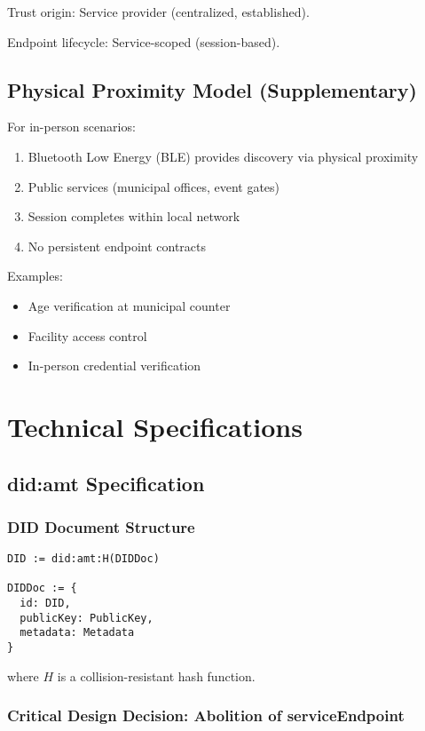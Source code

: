 Trust origin: Service provider (centralized, established).

Endpoint lifecycle: Service-scoped (session-based).

\section{Physical Proximity Model (Supplementary)}

For in-person scenarios:
\begin{enumerate}
  \item Bluetooth Low Energy (BLE) provides discovery via physical proximity
  \item Public services (municipal offices, event gates)
  \item Session completes within local network
  \item No persistent endpoint contracts
\end{enumerate}

Examples:
\begin{itemize}
  \item Age verification at municipal counter
  \item Facility access control
  \item In-person credential verification
\end{itemize}

\chapter{Technical Specifications}

\section{did:amt Specification}

\subsection{DID Document Structure}

\begin{verbatim}
DID := did:amt:H(DIDDoc)

DIDDoc := {
  id: DID,
  publicKey: PublicKey,
  metadata: Metadata
}
\end{verbatim}

where $H$ is a collision-resistant hash function.

\subsection{Critical Design Decision: Abolition of serviceEndpoint}


